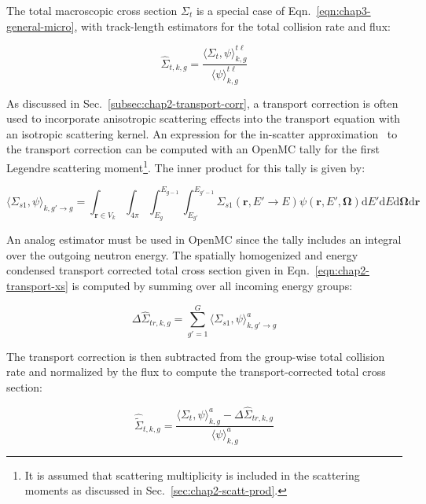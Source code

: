 The total macroscopic cross section $\Sigma_{t}$ is a special case of Eqn.~\ref{eqn:chap3-general-micro}, with track-length estimators for the total collision rate and flux:

\begin{equation}
\label{eqn:chap3-total-macro}
\hat{\Sigma}_{t,k,g} = \frac{\langle \Sigma_{t}, \psi \rangle_{k,g}^{t\ell}}{\langle \psi \rangle_{k,g}^{t\ell}}
\end{equation}

As discussed in Sec.~\ref{subsec:chap2-transport-corr}, a transport correction is often used to incorporate anisotropic scattering effects into the transport equation with an isotropic scattering kernel. An expression for the in-scatter approximation~\cite{yamamoto2008simplified} to the transport correction can be computed with an OpenMC tally for the first Legendre scattering moment\footnote{It is assumed that scattering multiplicity is included in the scattering moments as discussed in Sec.~\ref{sec:chap2-scatt-prod}.}. The inner product for this tally is given by:

\begin{equation}
\label{eqn:chap3-sigs1}
\langle \Sigma_{s1}, \psi \rangle_{k,g'\rightarrow g} = \int_{\mathbf{r} \in V_{k}} \int_{4\pi} \int_{E_{g}}^{E_{g-1}} \int_{E_{g'}}^{E_{g'-1}} \Sigma_{s1}(\mathbf{r},E'\rightarrow E)\psi(\mathbf{r},E',\mathbf{\Omega}) \mathrm{d}E'\mathrm{d}E\mathrm{d}\mathbf{\Omega}\mathrm{d}\mathbf{r}
\end{equation}

\noindent An analog estimator must be used in OpenMC since the tally includes an integral over the outgoing neutron energy. The spatially homogenized and energy condensed transport corrected total cross section given in Eqn.~\ref{eqn:chap2-transport-xs} is computed by summing over all incoming energy groups:

\begin{equation}
\label{eqn:chap3-transport-corr-macro}
\Delta\hat{\Sigma}_{tr,k,g} = \displaystyle\sum\limits_{g'=1}^{G} \langle{\Sigma_{s1}, \psi \rangle_{k,g'\rightarrow g}^{a}}
\end{equation}

\noindent The transport correction is then subtracted from the group-wise total collision rate and normalized by the flux to compute the transport-corrected total cross section:

\begin{equation}
\label{eqn:chap3-sigt-transport-macro}
\hat{\tilde{\Sigma}}_{t,k,g} = \frac{\langle \Sigma_{t}, \psi \rangle_{k,g}^{a} - \Delta\hat{\Sigma}_{tr,k,g}}{\langle \psi \rangle_{k,g}^{a}}
\end{equation}

